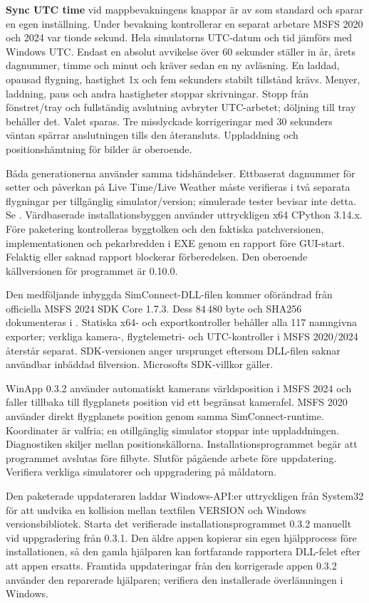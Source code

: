 \documentclass[11pt,a4paper]{article}
\newcommand{\filepath}[1]{\path{#1}}
\newcommand{\ui}[1]{\textbf{#1}}
\begin{document}
\ui{Sync UTC time} vid mappbevakningens knappar är av som standard och sparar
en egen inställning. Under bevakning kontrollerar en separat arbetare MSFS 2020
och 2024 var tionde sekund. Hela simulatorns UTC-datum och tid jämförs med
Windows UTC. Endast en absolut avvikelse över 60 sekunder ställer in år,
årets dagnummer, timme och minut och kräver sedan en ny avläsning.
En laddad, opausad flygning, hastighet 1x och fem sekunders stabilt tillstånd
krävs. Menyer, laddning, paus och andra hastigheter stoppar skrivningar.
Stopp från fönstret/tray och fullständig avslutning avbryter UTC-arbetet;
döljning till tray behåller det. Valet sparas. Tre misslyckade korrigeringar med
30 sekunders väntan spärrar anslutningen tills den återansluts. Uppladdning och
positionshämtning för bilder är oberoende.

Båda generationerna använder samma tidshändelser. Ettbaserat dagnummer för
setter och påverkan på Live Time/Live Weather måste verifieras i två separata
flygningar per tillgänglig simulator/version; simulerade tester bevisar inte
detta. Se \filepath{winapp/README.md}. Värdbaserade installationsbyggen använder
uttryckligen x64 CPython 3.14.x. Före paketering kontrolleras byggtolken och
den faktiska patchversionen, implementationen och pekarbredden i EXE genom en
rapport före GUI-start. Felaktig eller saknad rapport blockerar förberedelsen.
Den oberoende källversionen för programmet är 0.10.0.

Den medföljande inbyggda SimConnect-DLL-filen kommer oförändrad från officiella
MSFS 2024 SDK Core 1.7.3. Dess 84\,480 byte och SHA256 dokumenteras i
\filepath{winapp/README.md}. Statiska x64- och exportkontroller behåller alla
117 namngivna exporter; verkliga kamera-, flygtelemetri- och UTC-kontroller i
MSFS 2020/2024 återstår separat. SDK-versionen anger ursprunget eftersom
DLL-filen
saknar användbar inbäddad filversion. Microsofts SDK-villkor gäller.

WinApp 0.3.2 använder automatiskt kamerans världsposition i MSFS 2024 och faller
tillbaka till flygplanets position vid ett begränsat kamerafel. MSFS 2020
använder direkt flygplanets position genom samma SimConnect-runtime. Koordinater
är valfria; en otillgänglig simulator stoppar inte uppladdningen. Diagnostiken
skiljer mellan positionskällorna. Installationsprogrammet begär att programmet
avslutas före filbyte. Slutför pågående arbete före uppdatering. Verifiera
verkliga simulatorer och uppgradering på måldatorn.

Den paketerade uppdateraren laddar Windows-API:er uttryckligen från System32 för
att undvika en kollision mellan textfilen VERSION och Windows versionsbibliotek.
Starta det verifierade installationsprogrammet 0.3.2 manuellt vid uppgradering
från 0.3.1. Den äldre appen kopierar sin egen hjälpprocess före installationen,
så den gamla hjälparen kan fortfarande rapportera DLL-felet efter att appen
ersatts. Framtida uppdateringar från den korrigerade appen 0.3.2 använder den
reparerade hjälparen; verifiera den installerade överlämningen i Windows.
\end{document}
